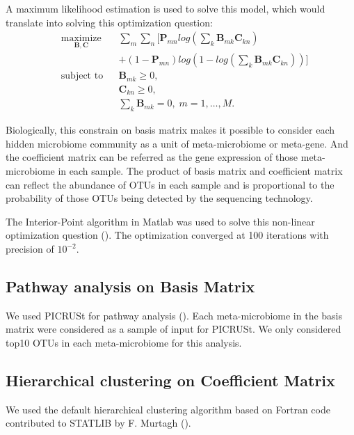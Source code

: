 \documentclass{bioinfo}
\begin{document}
\begin{methods}
A maximum likelihood estimation is used to solve this model, which would translate into solving this optimization question:
\begin{equation}
\begin{aligned}
& \underset{\boldsymbol{B},\boldsymbol{C}}{\text{maximize}}
&& \sum_{m}\sum_{n}[\boldsymbol{P}_{mn}log(\sum_{k}\boldsymbol{B}_{mk}\boldsymbol{C}_{kn})\\
&&& +(1-\boldsymbol{P}_{mn})log(1-log(\sum_{k}\boldsymbol{B}_{mk}\boldsymbol{C}_{kn}))] \\
& \text{subject to}
&& \boldsymbol{B}_{mk} \geq 0, \\
&&& \boldsymbol{C}_{kn} \geq 0, \\
&&& \sum_{k}\boldsymbol{B}_{mk} = 0, \; m = 1, \ldots, M.
\end{aligned}
\end{equation} 

Biologically, this constrain on basis matrix makes it possible to consider each hidden microbiome community as a unit of meta-microbiome or meta-gene. And the coefficient matrix can be referred as the gene expression of those meta-microbiome in each sample. The product of basis matrix and coefficient matrix can reflect the abundance of OTUs in each sample and is proportional to the probability of those OTUs being detected by the sequencing technology.

The Interior-Point algorithm in Matlab was used to solve this non-linear optimization question (\cite{Byrd2000}). The optimization converged at 100 iterations with precision of $10^{-2}$. 

\subsection{Pathway analysis on Basis Matrix}
We used PICRUSt for pathway analysis (\citealp{Langille2013}). Each meta-microbiome in the basis matrix were considered as a sample of input for PICRUSt. 
We only considered top10 OTUs in each meta-microbiome for this analysis. 

\subsection{Hierarchical clustering on Coefficient Matrix}
We used the default hierarchical clustering algorithm based on Fortran code contributed to STATLIB by F. Murtagh (\citealp{Murtagh1985}).

\end{methods}
\end{document}
